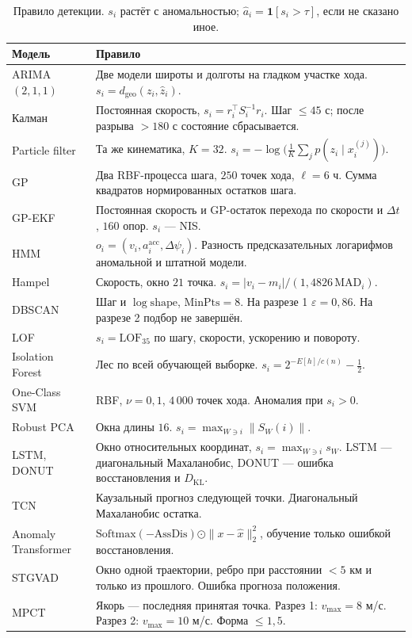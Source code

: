 \documentclass[a4paper,12pt]{report}
\begin{document}
\begin{table}[H]
\centering
\caption{Правило детекции. \(s_i\) растёт с аномальностью; \(\hat a_i=\mathbf{1}[s_i>\tau]\), если не сказано иное.}
\footnotesize
\singlespacing
\begin{tabular}{@{}>{\raggedright\arraybackslash}p{}>{\raggedright\arraybackslash}p{}@{}}
\toprule
Модель & Правило \\
\midrule
ARIMA\((2,1,1)\) & Две модели широты и долготы на гладком участке хода. \(s_i=d_{\mathrm{geo}}(z_i,\hat z_i)\). \\
Калман & Постоянная скорость, \(s_i=r_i^{\top}S_i^{-1}r_i\). Шаг \(\le 45\) с; после разрыва \(>180\) с состояние сбрасывается. \\
Particle filter & Та же кинематика, \(K=32\). \(s_i=-\log\bigl(\frac1K\sum_j p(z_i\mid x_i^{(j)})\bigr)\). \\
GP & Два RBF-процесса шага, \(250\) точек хода, \(\ell=6\) ч. Сумма квадратов нормированных остатков шага. \\
GP-EKF & Постоянная скорость и GP-остаток перехода по скорости и \(\Delta t\), \(160\) опор. \(s_i\) --- NIS. \\
HMM & \(o_i=(v_i,a_i^{\mathrm{acc}},\Delta\psi_i)\). Разность предсказательных логарифмов аномальной и штатной модели. \\
Hampel & Скорость, окно \(21\) точка. \(s_i=|v_i-m_i|/(1{,}4826\,\mathrm{MAD}_i)\). \\
DBSCAN & Шаг и \(\log\mathrm{shape}\), \(\mathrm{MinPts}=8\). На разрезе 1 \(\varepsilon=0{,}86\). На разрезе 2 подбор не завершён. \\
LOF & \(s_i=\mathrm{LOF}_{35}\) по шагу, скорости, ускорению и повороту. \\
Isolation Forest & Лес по всей обучающей выборке. \(s_i=2^{-E[h]/c(n)}-\frac12\). \\
One-Class SVM & RBF, \(\nu=0{,}1\), \(4\,000\) точек хода. Аномалия при \(s_i>0\). \\
Robust PCA & Окна длины \(16\). \(s_i=\max_{W\ni i}\|S_W(i)\|\). \\
LSTM, DONUT & Окно относительных координат, \(s_i=\max_{W\ni i}s_W\). LSTM --- диагональный Махаланобис, DONUT --- ошибка восстановления и \(D_{\mathrm{KL}}\). \\
TCN & Каузальный прогноз следующей точки. Диагональный Махаланобис остатка. \\
Anomaly Transformer & \(\mathrm{Softmax}(-\mathrm{AssDis})\odot\|x-\hat x\|_2^2\), обучение только ошибкой восстановления. \\
STGVAD & Окно одной траектории, ребро при расстоянии \(<5\) км и только из прошлого. Ошибка прогноза положения. \\
MPCT & Якорь --- последняя принятая точка. Разрез 1: \(v_{\max}=8\) м/с. Разрез 2: \(v_{\max}=10\) м/с. Форма \(\le 1{,}5\). \\
\bottomrule
\end{tabular}
\end{table}
\end{document}
